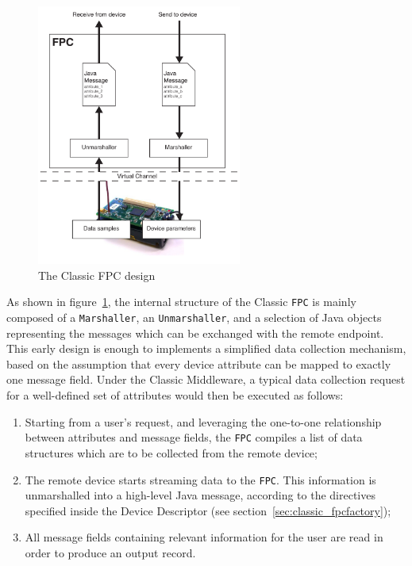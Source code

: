 \begin{figure}[h!]
\center
\includegraphics[width=0.6\textwidth]{imgs/classic_fpc.pdf}
\caption{The Classic FPC design}
\label{fig:classic_fpc}
\end{figure}

As shown in figure~\ref{fig:classic_fpc}, the internal structure of the Classic
\texttt{FPC} is mainly composed of a \texttt{Marshaller}, an
\texttt{Unmarshaller}, and a selection of Java objects representing the
messages which can be exchanged with the remote endpoint. This early design is
enough to implements a simplified data collection mechanism, based on the
assumption that every device attribute can be mapped to exactly one message
field. Under the Classic Middleware, a typical data collection request for a
well-defined set of attributes would then be executed as follows:

\begin{enumerate}

    \item Starting from a user's request, and leveraging the one-to-one
        relationship between attributes and message fields, the \texttt{FPC}
        compiles a list of data structures which are to be collected from the
        remote device;

    \item The remote device starts streaming data to the \texttt{FPC}. This
        information is unmarshalled into a high-level Java message, according
        to the directives specified inside the Device Descriptor (see
        section~\ref{sec:classic_fpcfactory});

    \item All message fields containing relevant information for the user are
        read in order to produce an output record.

\end{enumerate}

